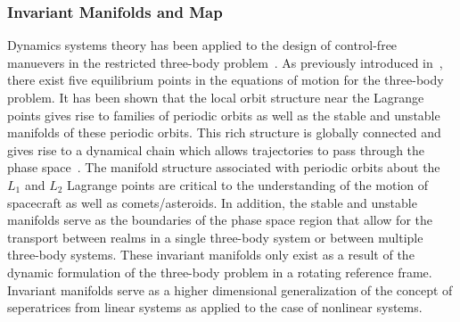 \documentclass[smallcondensed]{svjour3}
\begin{document}
\subsubsection{Invariant Manifolds and \Poincare Map}\label{sec:invariant_manifold}
Dynamics systems theory has been applied to the design of control-free manuevers in the restricted three-body problem~\cite{koon2011}.
As previously introduced in~, there exist five equilibrium points in the equations of motion for the three-body problem.
It has been shown that the local orbit structure near the Lagrange points gives rise to families of periodic orbits as well as the stable and unstable manifolds of these periodic orbits.
This rich structure is globally connected and gives rise to a dynamical chain which allows trajectories to pass through the phase space~\cite{koon2011,conley1968}.
The manifold structure associated with periodic orbits about the \( L_1 \) and \( L_2 \) Lagrange points are critical to the understanding of the motion of spacecraft as well as comets/asteroids.
In addition, the stable and unstable manifolds serve as the boundaries of the phase space region that allow for the transport between realms in a single three-body system or between multiple three-body systems.
These invariant manifolds only exist as a result of the dynamic formulation of the three-body problem in a rotating reference frame. 
Invariant manifolds serve as a higher dimensional generalization of the concept of seperatrices from linear systems as applied to the case of nonlinear systems. 
\end{document}
